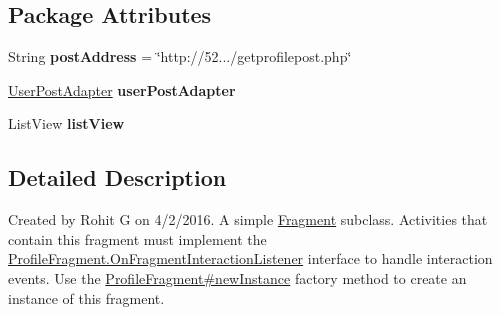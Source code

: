 \subsection*{\-Package \-Attributes}
\begin{DoxyCompactItemize}
\item 
\hypertarget{classcom_1_1example_1_1sel_1_1lostfound_1_1ProfileFragment_aeba284ce4f160774eb60a5ce72fdc66b}{\-String {\bfseries post\-Address} = \char`\"{}http\-://52.../getprofilepost.\-php\char`\"{}}\label{classcom_1_1example_1_1sel_1_1lostfound_1_1ProfileFragment_aeba284ce4f160774eb60a5ce72fdc66b}

\item 
\hypertarget{classcom_1_1example_1_1sel_1_1lostfound_1_1ProfileFragment_a90a853de02463489353579c01413073a}{\hyperlink{classcom_1_1example_1_1sel_1_1lostfound_1_1UserPostAdapter}{\-User\-Post\-Adapter} {\bfseries user\-Post\-Adapter}}\label{classcom_1_1example_1_1sel_1_1lostfound_1_1ProfileFragment_a90a853de02463489353579c01413073a}

\item 
\hypertarget{classcom_1_1example_1_1sel_1_1lostfound_1_1ProfileFragment_aafe1d8cd50e0576459475886214d2f37}{\-List\-View {\bfseries list\-View}}\label{classcom_1_1example_1_1sel_1_1lostfound_1_1ProfileFragment_aafe1d8cd50e0576459475886214d2f37}

\end{DoxyCompactItemize}


\subsection{\-Detailed \-Description}
\-Created by \-Rohit \-G on 4/2/2016. \-A simple \hyperlink{}{\-Fragment} subclass. \-Activities that contain this fragment must implement the \hyperlink{interfacecom_1_1example_1_1sel_1_1lostfound_1_1ProfileFragment_1_1OnFragmentInteractionListener}{\-Profile\-Fragment.\-On\-Fragment\-Interaction\-Listener} interface to handle interaction events. \-Use the \hyperlink{classcom_1_1example_1_1sel_1_1lostfound_1_1ProfileFragment_a2a0246ef59fbd7dd833eb7db772302c6}{\-Profile\-Fragment\#new\-Instance} factory method to create an instance of this fragment. 


